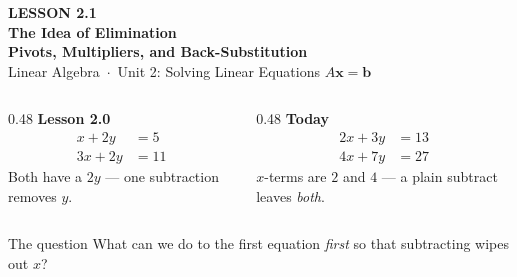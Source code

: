 \documentclass[aspectratio=169, 11pt]{beamer}
\newcommand{\xx}{\mathbf{x}}
\newcommand{\bb}{\mathbf{b}}
\begin{document}
{
\begin{frame}[plain]
  \vspace{2.8cm}\hspace{0.55cm}%
  \begin{minipage}{0.9\textwidth}
    {\color{goldacc}\bfseries\small LESSON 2.1}\\[0.5cm]
    {\color{white}\bfseries\LARGE The Idea of Elimination}\\[0.3cm]
    {\color{white}\bfseries\large Pivots, Multipliers, and Back-Substitution}\\[1.0cm]
    {\color{blushmid}\small Linear Algebra~$\cdot$~Unit 2: Solving Linear Equations $A\xx=\bb$}
  \end{minipage}
\end{frame}
}

\begin{frame}[t, plain]
  \begin{columns}[T]
    \begin{column}{0.48\textwidth}
      \textbf{Lesson 2.0}
      \[
        \begin{aligned}
          x + 2y &= 5 \\
          3x + 2y &= 11
        \end{aligned}
      \]
      Both have a $2y$ --- one subtraction removes $y$.
    \end{column}
    \begin{column}{0.48\textwidth}
      \textbf{Today}
      \[
        \begin{aligned}
          2x + 3y &= 13 \\
          4x + 7y &= 27
        \end{aligned}
      \]
      $x$-terms are $2$ and $4$ --- a plain subtract leaves \emph{both}.
    \end{column}
  \end{columns}
  \vspace{6pt}
  \begin{block}{The question}
    What can we do to the first equation \emph{first} so that subtracting wipes out $x$?
  \end{block}
\end{frame}
\end{document}
